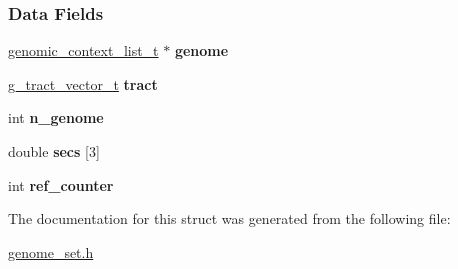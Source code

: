 \subsubsection*{Data Fields}
\begin{DoxyCompactItemize}
\item 
\mbox{\label{structgenome__set__struct_a78911008139357e37dc794be6d54132e}} 
\hyperlink{structgenomic__context__list__struct}{genomic\+\_\+context\+\_\+list\+\_\+t} $\ast$ {\bfseries genome}
\item 
\mbox{\label{structgenome__set__struct_a12b43be4e45be188fb908619b83d2069}} 
\hyperlink{structg__tract__vector__struct}{g\+\_\+tract\+\_\+vector\+\_\+t} {\bfseries tract}
\item 
\mbox{\label{structgenome__set__struct_acf6e4db81ffef1928273c9c33774e91b}} 
int {\bfseries n\+\_\+genome}
\item 
\mbox{\label{structgenome__set__struct_aca9a6a9f29b873de32db72d11bac241b}} 
double {\bfseries secs} \mbox{[}3\mbox{]}
\item 
\mbox{\label{structgenome__set__struct_ac9a18bec1d753cd0b4b15b1c9d4a480a}} 
int {\bfseries ref\+\_\+counter}
\end{DoxyCompactItemize}


The documentation for this struct was generated from the following file\+:\begin{DoxyCompactItemize}
\item 
\hyperlink{genome__set_8h}{genome\+\_\+set.\+h}\end{DoxyCompactItemize}

